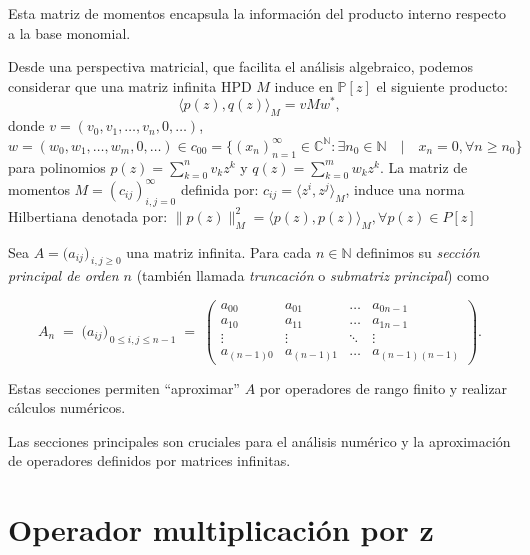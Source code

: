Esta matriz de momentos encapsula la información del producto interno respecto a la base monomial.

Desde una perspectiva matricial, que facilita el análisis algebraico, podemos considerar que una matriz infinita HPD $M$ induce en $\mathbb{P}[z]$ el siguiente producto:
\begin{equation}
  \langle p(z), q(z) \rangle_M = v M w^{*},
\end{equation}
donde $v = (v_0, v_1, \ldots, v_n, 0, \ldots)$, $w = (w_0, w_1, \ldots, w_m, 0, \ldots) \in c_{00} = \{(x_n)_{n=1}^{\infty} \in \mathbb{C}^{\mathbb{N}} : \exists n_0 \in \mathbb{N} \quad | \quad x_n=0 ,\forall n\geq n_0\}$ para polinomios $p(z) = \sum_{k=0}^n v_k z^k$ y $q(z) = \sum_{k=0}^m w_k z^k$. La matriz de momentos $M = (c_{ij})^{\infty}_{i,j=0}$ definida por: $c_{ij} = \langle z^i, z^j \rangle_{M}$, induce una norma Hilbertiana denotada por: $\|p(z)\|^{2}_{M} = \langle p(z), p(z)\rangle_{M},\forall p(z) \in P[z]$

\begin{definition}\label{def:section_matrix}
  Sea \(A=\bigl(a_{ij}\bigr)_{\,i,j\ge 0}\) una matriz infinita.
  Para cada \(n\in\mathbb{N}\) definimos su \emph{sección principal de orden \(n\)} (también llamada
  \emph{truncación} o \emph{submatriz principal}) como

  \[
    A_n \;=\;
    \bigl(a_{ij}\bigr)_{\,0\le i,j\le n-1}\;=\;
    \begin{pmatrix}
      a_{00}     & a_{01}     & \dots  & a_{0n-1}       \\
      a_{10}     & a_{11}     & \dots  & a_{1n-1}       \\
      \vdots     & \vdots     & \ddots & \vdots         \\
      a_{(n-1)0} & a_{(n-1)1} & \dots  & a_{(n-1)(n-1)}
    \end{pmatrix}.
  \]

  Estas secciones permiten “aproximar” \(A\) por operadores de rango finito y realizar cálculos numéricos.
\end{definition}

Las secciones principales son cruciales para el análisis numérico y la aproximación de operadores definidos por matrices infinitas.

\section{Operador multiplicación por z}

